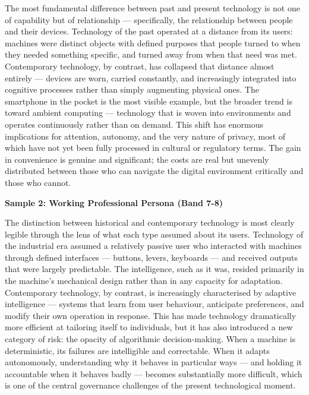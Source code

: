 The most fundamental difference between past and present technology is not one of capability but of relationship — specifically, the relationship between people and their devices. Technology of the past operated at a distance from its users: machines were distinct objects with defined purposes that people turned to when they needed something specific, and turned away from when that need was met. Contemporary technology, by contrast, has collapsed that distance almost entirely — devices are worn, carried constantly, and increasingly integrated into cognitive processes rather than simply augmenting physical ones. The smartphone in the pocket is the most visible example, but the broader trend is toward ambient computing — technology that is woven into environments and operates continuously rather than on demand. This shift has enormous implications for attention, autonomy, and the very nature of privacy, most of which have not yet been fully processed in cultural or regulatory terms. The gain in convenience is genuine and significant; the costs are real but unevenly distributed between those who can navigate the digital environment critically and those who cannot.

\textbf{Sample 2: Working Professional Persona (Band 7-8)}

The distinction between historical and contemporary technology is most clearly legible through the lens of what each type assumed about its users. Technology of the industrial era assumed a relatively passive user who interacted with machines through defined interfaces — buttons, levers, keyboards — and received outputs that were largely predictable. The intelligence, such as it was, resided primarily in the machine's mechanical design rather than in any capacity for adaptation. Contemporary technology, by contrast, is increasingly characterised by adaptive intelligence — systems that learn from user behaviour, anticipate preferences, and modify their own operation in response. This has made technology dramatically more efficient at tailoring itself to individuals, but it has also introduced a new category of risk: the opacity of algorithmic decision-making. When a machine is deterministic, its failures are intelligible and correctable. When it adapts autonomously, understanding why it behaves in particular ways — and holding it accountable when it behaves badly — becomes substantially more difficult, which is one of the central governance challenges of the present technological moment.

\separator

